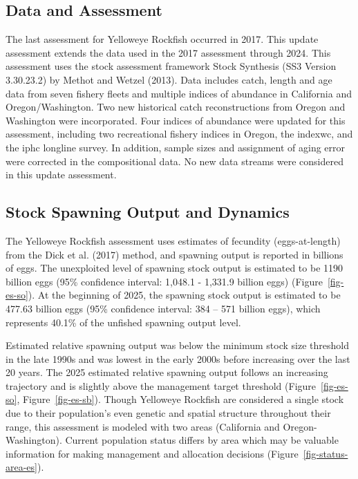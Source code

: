 \documentclass[
  english,
]{article}
\begin{document}
\clearpage

\subsection*{Data and Assessment}\label{data-and-assessment}

The last assessment for Yelloweye Rockfish occurred in 2017. This update
assessment extends the data used in the 2017 assessment through 2024.
This assessment uses the stock assessment framework Stock Synthesis (SS3
Version 3.30.23.2) by Methot and Wetzel (2013). Data includes catch,
length and age data from seven fishery fleets and multiple indices of
abundance in California and Oregon/Washington. Two new historical catch
reconstructions from Oregon and Washington were incorporated. Four
indices of abundance were updated for this assessment, including two
recreational fishery indices in Oregon, the \gls{indexwc}, and the
\gls{iphc} longline survey. In addition, sample sizes and assignment of
aging error were corrected in the compositional data. No new data
streams were considered in this update assessment.

\subsection*{Stock Spawning Output and
Dynamics}\label{stock-spawning-output-and-dynamics}

The Yelloweye Rockfish assessment uses estimates of fecundity
(eggs-at-length) from the Dick et al. (2017) method, and spawning output
is reported in billions of eggs. The unexploited level of spawning stock
output is estimated to be 1190 billion eggs (95\% confidence interval:
1,048.1 - 1,331.9 billion eggs) (Figure~\ref{fig-es-so}). At the
beginning of 2025, the spawning stock output is estimated to be 477.63
billion eggs (95\% confidence interval: 384 -- 571 billion eggs), which
represents 40.1\% of the unfished spawning output level.

Estimated relative spawning output was below the minimum stock size
threshold in the late 1990s and was lowest in the early 2000s before
increasing over the last 20 years. The 2025 estimated relative spawning
output follows an increasing trajectory and is slightly above the
management target threshold (Figure~\ref{fig-es-so},
Figure~\ref{fig-es-sb}). Though Yelloweye Rockfish are considered a
single stock due to their population's even genetic and spatial
structure throughout their range, this assessment is modeled with two
areas (California and Oregon-Washington). Current population status
differs by area which may be valuable information for making management
and allocation decisions (Figure~\ref{fig-status-area-es}).
\end{document}
